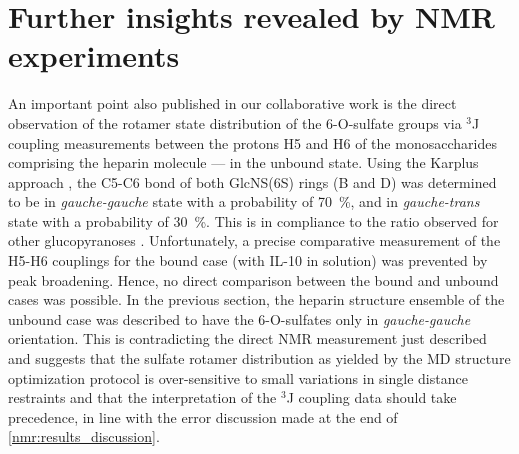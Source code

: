 
\section{Further insights revealed by NMR experiments}
\label{nmr:further_insights}

An important point also published in our collaborative work
\cite{kuenze_gehrcke_2014} is the direct observation of the rotamer state
distribution of the 6-O-sulfate groups via ${}^{3}$J coupling measurements
between the protons H5 and H6 of the monosaccharides comprising the heparin
molecule --- in the unbound state. Using the Karplus approach
\cite{haasnoot_karplus_1980,nishida_rotameric_nmr_1988}, the C5-C6 bond of both
GlcNS(6S) rings (B and D) was determined to be in \textit{gauche-gauche} state
with a probability of \SI{70}{\percent}, and in  \textit{gauche-trans} state
with a probability of \SI{30}{\percent}. This is in compliance to the ratio
observed for other glucopyranoses \cite{nishida_rotameric_nmr_1988}.
Unfortunately, a precise comparative measurement of the H5-H6 couplings for the
bound case (with IL-10 in solution) was prevented by peak broadening. Hence, no
direct comparison between the bound and unbound cases was possible. In the
previous section, the heparin structure ensemble of the unbound case was
described to have the 6-O-sulfates only in \textit{gauche-gauche} orientation.
This is contradicting the direct NMR measurement just described and suggests
that the sulfate rotamer distribution as yielded by the MD structure
optimization protocol is over-sensitive to small variations in single distance
restraints and that the interpretation of the ${}^{3}$J coupling data should
take precedence, in line with the error discussion made at the end of
\cref{nmr:results_discussion}.

